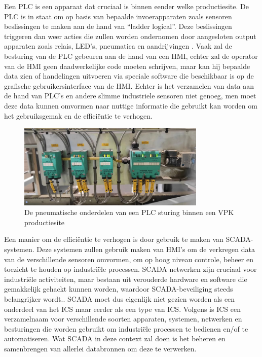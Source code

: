 Een PLC is een apparaat dat cruciaal is binnen eender welke productiesite. De PLC is in staat om op basis van bepaalde invoerapparaten zoals sensoren beslissingen te maken aan de hand van “ladder logical”. Deze beslissingen triggeren dan weer acties die zullen worden ondernomen door aangesloten output apparaten zoals relais, LED’s, pneumatica en aandrijvingen \autocite{unitronics2025}.
Vaak zal de besturing van de PLC gebeuren aan de hand van een HMI, echter zal de operator van de HMI geen daadwerkelijke code moeten schrijven, maar kan hij bepaalde data zien of handelingen uitvoeren via speciale software die beschikbaar is op de grafische gebruikersinterface van de HMI. 
Echter is het verzamelen van data aan de hand van PLC’s en andere slimme industriele sensoren niet genoeg, men moet deze data kunnen omvormen naar nuttige informatie die gebruikt kan worden om het gebruiksgemak en de efficiëntie te verhogen. 

\begin{figure}[H]
    \centering
    \includegraphics[width=0.8\textwidth]{fotos/PLC_pneumatica.jpg}
    \caption[Pneumatica PLC]{\label{fig:grail}De pneumatische onderdelen van een PLC sturing binnen een VPK productiesite}
\end{figure} 

Een manier om de efficiëntie te verhogen is door gebruik te maken van SCADA-systemen. 
Deze systemen zullen gebruik maken van HMI’s om de verkregen data van de verschillende sensoren omvormen, om op hoog niveau controle, beheer en toezicht te houden op industriële processen. SCADA netwerken zijn cruciaal voor industriële activiteiten, maar bestaan uit verouderde hardware en software die gemakkelijk gehackt kunnen worden, waardoor SCADA-beveiliging steeds belangrijker wordt.\autocite{FortinetSC2025}. SCADA moet dus eigenlijk niet gezien worden als een onderdeel van het ICS maar eerder als een type van ICS. 
Volgens \textcite{Mhaskar2021} is ICS een verzamelnaam voor verschillende soorten apparaten, systemen, netwerken en besturingen die worden gebruikt om industriële processen te bedienen en/of te automatiseren. Wat SCADA in deze context zal doen is het beheren en samenbrengen van allerlei databronnen om deze te verwerken.


